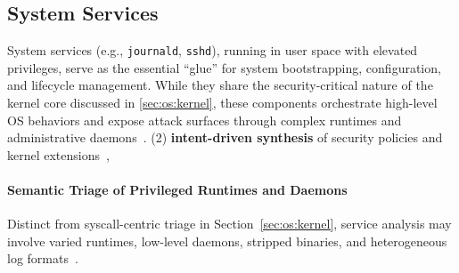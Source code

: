 \subsection{System Services} 
\label{sec:os:services}
System services (e.g., \texttt{journald}, \texttt{sshd}), running in user space with elevated privileges, serve as the essential ``glue'' for system bootstrapping, configuration, and lifecycle management. While they share the security-critical nature of the kernel core discussed in \ref{sec:os:kernel}, these components orchestrate high-level OS behaviors and expose attack surfaces through complex runtimes and administrative daemons~\cite{kerrisk2010linux}. 
(2) \textbf{intent-driven synthesis} of security policies and kernel extensions~\cite{gao2025offloading, zheng2024kgent},

\paragraph{Semantic Triage of Privileged Runtimes and Daemons}
Distinct from syscall-centric triage in Section~\ref{sec:os:kernel}, service analysis may involve varied runtimes, low-level daemons, stripped binaries, and heterogeneous log formats~\cite{xiong2023hext5,guan2024logllm}.

